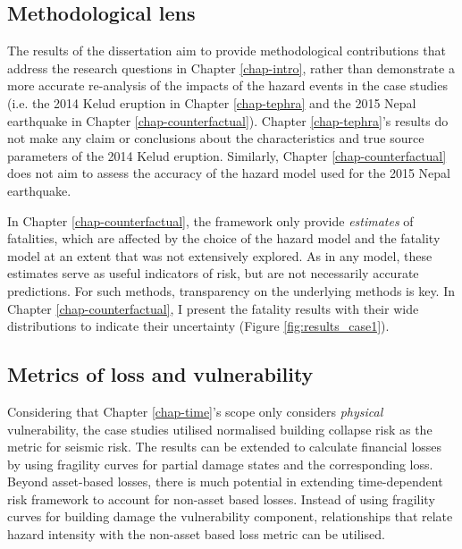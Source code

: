 \subsection{Methodological lens}

    The results of the dissertation aim to provide methodological contributions that address the research questions in Chapter \ref{chap-intro}, rather than demonstrate a more accurate re-analysis of the impacts of the hazard events in the case studies (i.e. the 2014 Kelud eruption in Chapter \ref{chap-tephra} and the 2015 Nepal earthquake in Chapter \ref{chap-counterfactual}). Chapter \ref{chap-tephra}'s results do not make any claim or conclusions about the characteristics and true source parameters of the 2014 Kelud eruption. Similarly, Chapter \ref{chap-counterfactual} does not aim to assess the accuracy of the hazard model used for the 2015 Nepal earthquake.

    In Chapter \ref{chap-counterfactual}, the framework only provide \textit{estimates} of fatalities, which are affected by the choice of the hazard model and the fatality model at an extent that was not extensively explored. As in any model, these estimates serve as useful indicators of risk, but are not necessarily accurate predictions. For such methods, transparency on the underlying methods is key. In Chapter \ref{chap-counterfactual}, I present the fatality results with their wide distributions to indicate their uncertainty (Figure \ref{fig:results_case1}). 

\subsection{Metrics of loss and vulnerability}

    Considering that Chapter \ref{chap-time}'s scope only considers \textit{physical} vulnerability, the case studies utilised normalised building collapse risk as the metric for seismic risk. The results can be extended to calculate financial losses by using fragility curves for partial damage states and the corresponding loss. Beyond asset-based losses, there is much potential in extending time-dependent risk framework to account for non-asset based losses. Instead of using fragility curves for building damage the vulnerability component, relationships that relate hazard intensity with the non-asset based loss metric can be utilised. 

